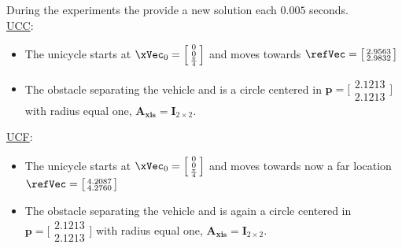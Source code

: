 During the experiments the  provide a new solution each \(0.005\) seconds.\\


\underline{UCC}:
\label{ssssec:UCC} %
\begin{itemize}
  \item The unicycle starts at \(\xVec_0 = \Bigl[\begin{smallmatrix} 0 \\ 0 \\ \frac{\pi}{4}  \end{smallmatrix}\Bigr]\) and moves towards \(\refVec = \bigl[\begin{smallmatrix} 2.9563 \\ 2.9832 \end{smallmatrix}\bigr]\)
  \item The obstacle separating the vehicle and \txtref is a circle centered in \(\mathbf{p} = \bigl[\begin{smallmatrix} 2.1213 \\ 2.1213 \end{smallmatrix}\bigr] \) with radius equal one, \(\mathbf{A_{xis}} = \mathbf{I}_{2 \times 2}\).
\end{itemize}

\underline{UCF}:
\label{ssssec:UCF} %
\begin{itemize}
  \item The unicycle starts at \(\xVec_0 = \Bigl[\begin{smallmatrix} 0 \\ 0 \\ \frac{\pi}{4}  \end{smallmatrix}\Bigr]\) and moves towards now a far location \(\refVec = \bigl[\begin{smallmatrix} 4.2087 \\ 4.2760 \end{smallmatrix}\bigr]\)
  \item The obstacle separating the vehicle and \txtref is again a circle centered in \(\mathbf{p} = \bigl[\begin{smallmatrix} 2.1213 \\ 2.1213 \end{smallmatrix}\bigr] \) with radius equal one, \(\mathbf{A_{xis}} = \mathbf{I}_{2 \times 2}\).
\end{itemize}

